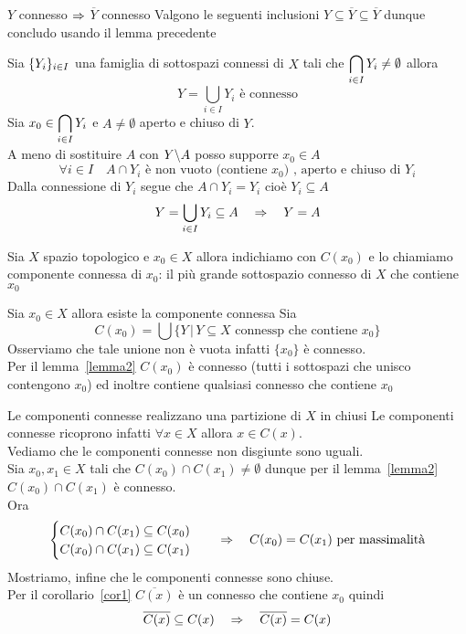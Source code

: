 \begin{cor}\label{cor1}$Y$ connesso $\Rightarrow$ $\overline{Y}$ connesso
\proof Valgono le seguenti inclusioni $Y \subseteq \overline{Y} \subseteq \overline{Y}$ dunque concludo usando il lemma precedente
\end{cor}
\spazio
\begin{lem}\label{lemma2} Sia $\displaystyle \{ Y_i\}_{i\in I}$ una famiglia di sottospazi connessi di $X$ tali che $\displaystyle \bigcap_{i \in I} Y_i \neq \emptyset$ allora
$$ Y= \bigcup_{i \in I } Y_i \text{ \`e connesso}$$
\proof Sia $x_0 \in \displaystyle \bigcap_{i \in I} Y_i $ e   $A \neq  \emptyset$ aperto e chiuso di $Y$.\\
A meno di sostituire $A$ con $Y \backslash A$ posso supporre $x_0 \in A$
$$ \forall i \in I \quad A \cap Y_i \text{ \`e non vuoto (contiene } x_0 \text{) , aperto e chiuso di } Y_i $$
Dalla connessione di $Y_i$ segue che $A\cap Y_i=Y_i$ cio\`e $Y_i \subseteq A $ 
$$ Y = \bigcup_{i \in I } Y_i \subseteq A \quad \Rightarrow \quad Y=A$$
\endproof
\end{lem}
\begin{defn}\bianco
Sia $X$ spazio topologico e $x_0\in X$ allora indichiamo con $C(x_0)$ e lo chiamiamo componente connessa di $x_0$: il pi\`u grande sottospazio connesso di $X$ che contiene $x_0$
\end{defn}
\begin{prop}Sia $x_0\in X$ allora esiste la componente connessa
\proof Sia 
$$ C(x_0) =\bigcup \{ Y \, \vert \, Y \subseteq X \text{ connessp che contiene } x_0\}$$
Osserviamo che tale unione non \`e vuota infatti $\{ x_0\}$ \`e connesso.\\
Per il lemma~\ref{lemma2} $C(x_0)$ \`e connesso (tutti i sottospazi che unisco contengono $x_0$) ed inoltre contiene qualsiasi connesso che contiene $x_0$
\end{prop}
\spazio
\begin{prop}Le componenti connesse realizzano una partizione di $X$ in chiusi
\proof Le componenti connesse ricoprono infatti $\forall x \in X $ allora $x \in C(x)$.\\
Vediamo che le componenti connesse non disgiunte sono uguali.\\
Sia $x_0, x_1\in X$ tali che  
$C(x_0) \cap C(x_1) \neq \emptyset$ dunque per il lemma~\ref{lemma2} $C(x_0) \cap C(x_1)$ \`e connesso.\\
Ora $$\begin{cases}C(x_0) \cap C(x_1) \subseteq C(x_0)\\ C(x_0) \cap C(x_1) \subseteq C(x_1)
\end{cases} \quad \Rightarrow \quad C(x_0)=C(x_1) \text{ per massimalit\`a}$$
Mostriamo, infine che le componenti connesse sono chiuse.\\
Per il corollario~\ref{cor1} $\overline{C(x)}$ \`e un connesso che contiene $x_0$ quindi
$$ \overline{C(x)} \subseteq C(x) \quad \Rightarrow \quad  \overline{C(x)} = C(x) $$
\end{prop}
